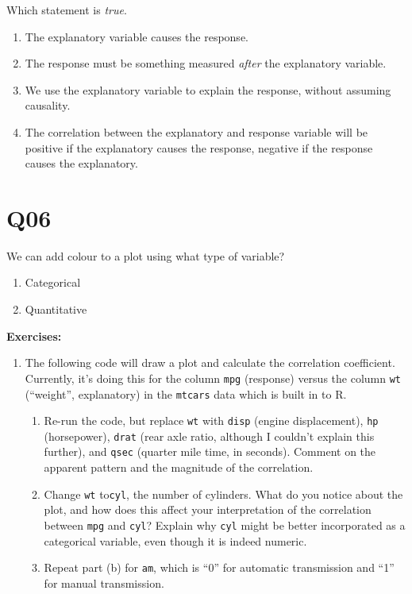 \documentclass[
  letterpaper,
  DIV=11,
  numbers=noendperiod]{scrreprt}
\providecommand{\tightlist}{%
  \setlength{\itemsep}{0pt}\setlength{\parskip}{0pt}}\usepackage{longtable,booktabs,array}
\begin{document}
Which statement is \emph{true}.

\begin{enumerate}
\def\labelenumi{\arabic{enumi}.}
\tightlist
\item
  The explanatory variable causes the response.
\item
  The response must be something measured \emph{after} the explanatory
  variable.
\item
  We use the explanatory variable to explain the response, without
  assuming causality.
\item
  The correlation between the explanatory and response variable will be
  positive if the explanatory causes the response, negative if the
  response causes the explanatory.
\end{enumerate}

\hypertarget{q06}{%
\section{Q06}\label{q06}}

We can add colour to a plot using what type of variable?

\begin{enumerate}
\def\labelenumi{\arabic{enumi}.}
\tightlist
\item
  Categorical
\item
  Quantitative
\end{enumerate}

\textbf{Exercises:}

\begin{enumerate}
\def\labelenumi{\arabic{enumi}.}
\tightlist
\item
  The following code will draw a plot and calculate the correlation
  coefficient. Currently, it's doing this for the column \texttt{mpg}
  (response) versus the column \texttt{wt} (``weight'', explanatory) in
  the \texttt{mtcars} data which is built in to R.

  \begin{enumerate}
  \def\labelenumii{\alph{enumii}.}
  \tightlist
  \item
    Re-run the code, but replace \texttt{wt} with \texttt{disp} (engine
    displacement), \texttt{hp} (horsepower), \texttt{drat} (rear axle
    ratio, although I couldn't explain this further), and \texttt{qsec}
    (quarter mile time, in seconds). Comment on the apparent pattern and
    the magnitude of the correlation.
  \item
    Change \texttt{wt} to\texttt{cyl}, the number of cylinders. What do
    you notice about the plot, and how does this affect your
    interpretation of the correlation between \texttt{mpg} and
    \texttt{cyl}? Explain why \texttt{cyl} might be better incorporated
    as a categorical variable, even though it is indeed numeric.
  \item
    Repeat part (b) for \texttt{am}, which is ``0'' for automatic
    transmission and ``1'' for manual transmission.
  \end{enumerate}
\end{enumerate}
\end{document}
